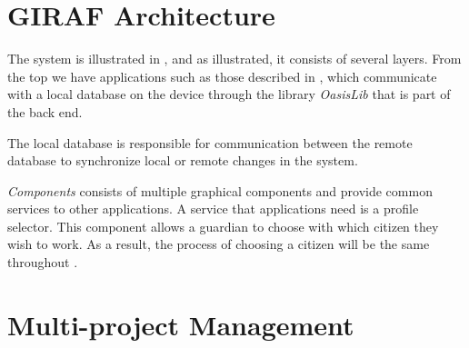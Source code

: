 \section{GIRAF Architecture}
\label{sec:giraf:architecture}
The \giraf system is illustrated in , and as illustrated, it consists of several layers. 
From the top we have applications such as those described in , which communicate with a local database on the device through the library \textit{OasisLib} that is part of the \giraf back end.

The local database is responsible for communication between the remote database to synchronize local or remote changes in the system.

\textit{\giraf Components} consists of multiple graphical components and provide common services to other \giraf applications.
A service that applications need is a profile selector.
This component allows a guardian to choose with which citizen they wish to work.
As a result, the process of choosing a citizen will be the same throughout \giraf.


\section{Multi-project Management}\label{sec:collab:multiproject}


